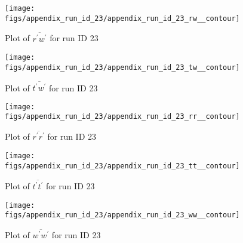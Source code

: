 \begin{figure}[H]
\centering
\texttt{[image: figs/appendix\_run\_id\_23/appendix\_run\_id\_23\_rw\_\_contour]}
\caption{Plot of $\overline{r^\prime w^\prime}$ for run ID 23}
\label{fig:appendix_run_id_23_rw__contour}
\end{figure}


\begin{figure}[H]
\centering
\texttt{[image: figs/appendix\_run\_id\_23/appendix\_run\_id\_23\_tw\_\_contour]}
\caption{Plot of $\overline{t^\prime w^\prime}$ for run ID 23}
\label{fig:appendix_run_id_23_tw__contour}
\end{figure}


\begin{figure}[H]
\centering
\texttt{[image: figs/appendix\_run\_id\_23/appendix\_run\_id\_23\_rr\_\_contour]}
\caption{Plot of $\overline{r^\prime r^\prime}$ for run ID 23}
\label{fig:appendix_run_id_23_rr__contour}
\end{figure}


\begin{figure}[H]
\centering
\texttt{[image: figs/appendix\_run\_id\_23/appendix\_run\_id\_23\_tt\_\_contour]}
\caption{Plot of $\overline{t^\prime t^\prime}$ for run ID 23}
\label{fig:appendix_run_id_23_tt__contour}
\end{figure}


\begin{figure}[H]
\centering
\texttt{[image: figs/appendix\_run\_id\_23/appendix\_run\_id\_23\_ww\_\_contour]}
\caption{Plot of $\overline{w^\prime w^\prime}$ for run ID 23}
\label{fig:appendix_run_id_23_ww__contour}
\end{figure}


